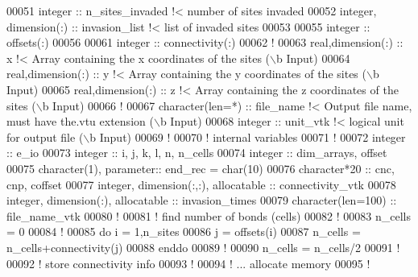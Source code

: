 \begin{DoxyCode}
00051 \textcolor{keywordtype}{integer} :: n\_sites\_invaded \textcolor{comment}{!< number of sites invaded}
00052 \textcolor{keywordtype}{integer}, \textcolor{keywordtype}{dimension(:)} :: invasion\_list \textcolor{comment}{!< list of invaded sites}
00053 
00055 \textcolor{keywordtype}{integer} :: offsets(:)
00056 
00061 \textcolor{keywordtype}{integer} :: connectivity(:)
00062 \textcolor{comment}{!}
00063 \textcolor{keywordtype}{real},\textcolor{keywordtype}{dimension(:)} :: x \textcolor{comment}{!< Array containing the x coordinates of the sites (\(\backslash\)b
       Input)}
00064 \textcolor{keywordtype}{real},\textcolor{keywordtype}{dimension(:)} :: y \textcolor{comment}{!< Array containing the y coordinates of the sites (\(\backslash\)b
       Input)}
00065 \textcolor{keywordtype}{real},\textcolor{keywordtype}{dimension(:)} :: z \textcolor{comment}{!< Array containing the z coordinates of the sites (\(\backslash\)b
       Input)}
00066 \textcolor{comment}{!}
00067 \textcolor{keywordtype}{character(len=*)} :: file\_name \textcolor{comment}{!< Output file name, must have the.vtu extension
       (\(\backslash\)b Input)}
00068 \textcolor{keywordtype}{integer} :: unit\_vtk \textcolor{comment}{!< logical unit for output file (\(\backslash\)b Input)}
00069 \textcolor{comment}{!}
00070 \textcolor{comment}{! internal variables}
00071 \textcolor{comment}{!}
00072 \textcolor{keywordtype}{integer} :: e\_io
00073 \textcolor{keywordtype}{integer} :: i, j, k, l, n, n\_cells
00074 \textcolor{keywordtype}{integer} :: dim\_arrays, offset
00075 \textcolor{keywordtype}{character(1)}, \textcolor{keywordtype}{parameter}:: end\_rec = char(10)
00076 \textcolor{keywordtype}{character*20} :: cnc, cnp, coffset
00077 \textcolor{keywordtype}{integer}, \textcolor{keywordtype}{dimension(:,:)}, \textcolor{keywordtype}{allocatable} :: connectivity\_vtk
00078 \textcolor{keywordtype}{integer}, \textcolor{keywordtype}{dimension(:)}, \textcolor{keywordtype}{allocatable} :: invasion\_times
00079 \textcolor{keywordtype}{character(len=100)} :: file\_name\_vtk
00080 \textcolor{comment}{!}
00081 \textcolor{comment}{! find number of bonds (cells)}
00082 \textcolor{comment}{!}
00083 n\_cells = 0
00084 \textcolor{comment}{!}
00085 \textcolor{keyword}{do} i = 1,n\_sites
00086    j = offsets(i)
00087    n\_cells = n\_cells+connectivity(j)
00088 \textcolor{keyword}{enddo}
00089 \textcolor{comment}{!}
00090 n\_cells = n\_cells/2
00091 \textcolor{comment}{!}
00092 \textcolor{comment}{! store connectivity info}
00093 \textcolor{comment}{!}
00094 \textcolor{comment}{! ... allocate memory}
00095 \textcolor{comment}{!}

\end{DoxyCode}
